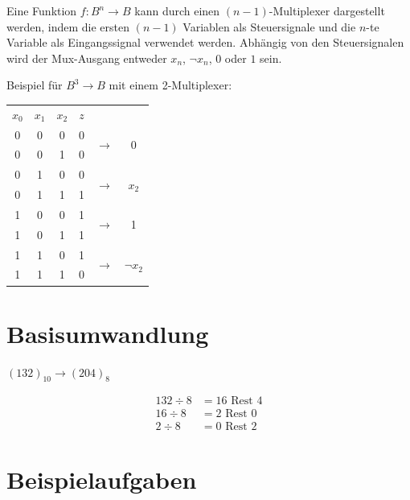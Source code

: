\documentclass[a4paper,6pt]{article}
\begin{document}
\begin{multicols*}{3}
Eine Funktion $ f : B^n \rightarrow B $ kann durch einen $ (n-1) $-Multiplexer dargestellt werden, indem die ersten $ (n-1) $ Variablen als Steuersignale und die $ n $-te Variable als Eingangssignal verwendet werden. Abhängig von den Steuersignalen wird der Mux-Ausgang entweder $ x_n $, $ \neg x_n $, $ 0 $ oder $ 1 $ sein.

Beispiel für $ B^3 \rightarrow B $ mit einem 2-Multiplexer:

\begin{center}
   \begin{tabular}{ccc|c|cc}
    $ x_0 $ & $ x_1 $ & $ x_2 $ & $ z $ & & \\
    \cline{1-6}
    0 & 0 & 0 & 0 & \multirow{2}{*}{$ \rightarrow $} & \multirow{2}{*}{0} \\
    0 & 0 & 1 & 0 & & \\
    \cline{1-6}
    0 & 1 & 0 & 0 & \multirow{2}{*}{$ \rightarrow $} & \multirow{2}{*}{$ x_2 $} \\
    0 & 1 & 1 & 1 & & \\
    \cline{1-6}
    1 & 0 & 0 & 1 & \multirow{2}{*}{$ \rightarrow $} & \multirow{2}{*}{1} \\
    1 & 0 & 1 & 1 & & \\
    \cline{1-6}
    1 & 1 & 0 & 1 & \multirow{2}{*}{$ \rightarrow $} & \multirow{2}{*}{$ \neg x_2 $} \\
    1 & 1 & 1 & 0 & & \\
    \cline{1-6}
    \end{tabular} 
\end{center}


\section*{Basisumwandlung}
$ (132)_{10} \rightarrow (204)_{8}$

\begin{align*}
132 \div 8 &= 16 \text{ Rest } 4 \\
16 \div 8 &= 2 \text{ Rest } 0 \\
2 \div 8 &= 0 \text{ Rest } 2
\end{align*}

\section{Beispielaufgaben}


\end{multicols*}
\end{document}
